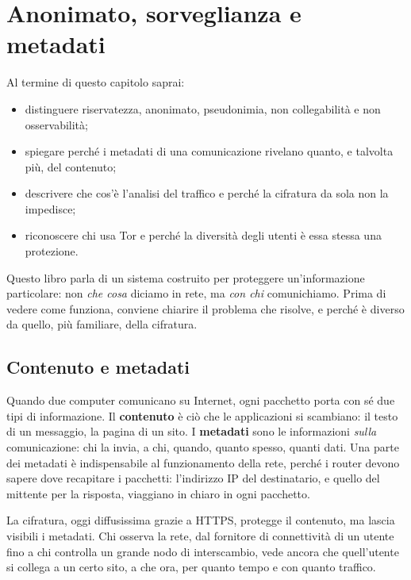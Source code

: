 \chapter{Anonimato, sorveglianza e metadati}\label{cap:01-anonimato}

\begin{obiettivi}
Al termine di questo capitolo saprai:
\begin{itemize}[nosep]
  \item distinguere riservatezza, anonimato, pseudonimia, non collegabilità e non osservabilità;
  \item spiegare perché i metadati di una comunicazione rivelano quanto, e talvolta più, del contenuto;
  \item descrivere che cos'è l'analisi del traffico e perché la cifratura da sola non la impedisce;
  \item riconoscere chi usa Tor e perché la diversità degli utenti è essa stessa una protezione.
\end{itemize}
\end{obiettivi}

Questo libro parla di un sistema costruito per proteggere un'informazione particolare: non \emph{che cosa} diciamo in rete, ma \emph{con chi} comunichiamo. Prima di vedere come funziona, conviene chiarire il problema che risolve, e perché è diverso da quello, più familiare, della cifratura.

\section{Contenuto e metadati}\label{sec:anon-metadati}

Quando due computer comunicano su Internet, ogni pacchetto porta con sé due tipi di informazione. Il \textbf{contenuto} è ciò che le applicazioni si scambiano: il testo di un messaggio, la pagina di un sito. I \textbf{metadati} sono le informazioni \emph{sulla} comunicazione: chi la invia, a chi, quando, quanto spesso, quanti dati. Una parte dei metadati è indispensabile al funzionamento della rete, perché i router devono sapere dove recapitare i pacchetti: l'indirizzo IP del destinatario, e quello del mittente per la risposta, viaggiano in chiaro in ogni pacchetto.

La cifratura, oggi diffusissima grazie a HTTPS, protegge il contenuto, ma lascia visibili i metadati. Chi osserva la rete, dal fornitore di connettività di un utente fino a chi controlla un grande nodo di interscambio, vede ancora che quell'utente si collega a un certo sito, a che ora, per quanto tempo e con quanto traffico.

